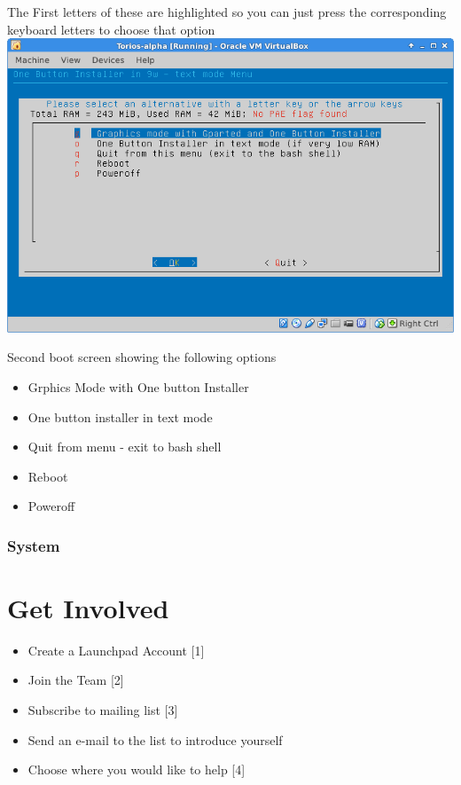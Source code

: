 \documentclass[12pt,a4paper]{book}
\begin{document}
The First letters of these are highlighted so you can just press the corresponding keyboard letters to choose that option \\

\includegraphics[width=0.7\linewidth]{boot-screen2}

Second boot screen showing the following options

\begin{itemize}
\item{Grphics Mode with One button Installer}
\item {One button installer in text mode}
\item{Quit from menu - exit to bash shell}
\item{Reboot}
\item{Poweroff}
\end{itemize}
\subsection{System}

\newpage

\subsection{}

\chapter{Get Involved}

\begin{itemize}
\item{Create a Launchpad Account [1]}
\item{Join the Team [2]}
\item{Subscribe to mailing list [3]}
\item{Send an e-mail to the list to introduce yourself}
\item{Choose where you would like to help [4]}
\end{itemize}
\end{document}
